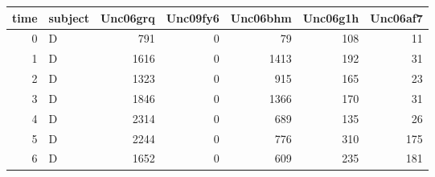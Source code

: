 \begin{tabular}{rlrrrrr}
  \hline
time & subject & Unc06grq & Unc09fy6 & Unc06bhm & Unc06g1h & Unc06af7 \\ 
  \hline
  0 & D & 791 &   0 &  79 & 108 &  11 \\ 
    1 & D & 1616 &   0 & 1413 & 192 &  31 \\ 
    2 & D & 1323 &   0 & 915 & 165 &  23 \\ 
    3 & D & 1846 &   0 & 1366 & 170 &  31 \\ 
    4 & D & 2314 &   0 & 689 & 135 &  26 \\ 
    5 & D & 2244 &   0 & 776 & 310 & 175 \\ 
    6 & D & 1652 &   0 & 609 & 235 & 181 \\ 
   \hline
\end{tabular}
